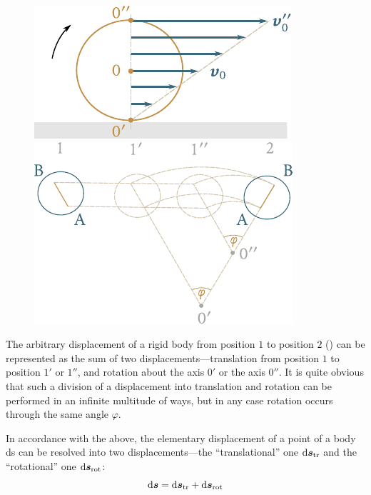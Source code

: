 \begin{figure}[t]
	\begin{minipage}[t]{0.5\linewidth}
		\begin{center}
			\includegraphics[scale=0.95]{figures/ch_05/fig_5_1.pdf}
			\caption[]{}
			\label{fig:5_1}
		\end{center}
	\end{minipage}
	\hspace{-0.05cm}
	\begin{minipage}[t]{0.5\linewidth}
		\begin{center}
			\includegraphics[scale=0.95]{figures/ch_05/fig_5_2.pdf}
			\caption[]{}
			\label{fig:5_2}
		\end{center}
	\end{minipage}
\vspace{-0.7cm}
\end{figure}

The arbitrary displacement of a rigid body from position $1$ to position $2$ () can be represented as the sum of two displacements---translation from position $1$ to position $1'$ or $1''$, and rotation about the axis $0'$ or the axis $0''$. It is quite obvious that such a division of a displacement into translation and rotation can be performed in an infinite multitude of ways, but in any case rotation occurs through the same angle $\varphi$.

In accordance with the above, the elementary displacement of a point of a body ds can be resolved into two displacements---the ``translational'' one $\mathrm{d}\boldsymbol{s}_{\text{tr}}$ and the ``rotational'' one $\mathrm{d}\boldsymbol{s}_{\text{rot}}$:
\begin{equation*}
\mathrm{d}\boldsymbol{s} = \mathrm{d}\boldsymbol{s}_{\text{tr}} + \mathrm{d}\boldsymbol{s}_{\text{rot}}
\end{equation*}

